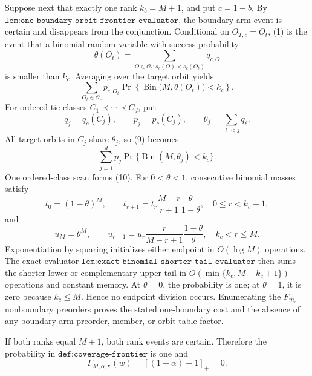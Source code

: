 Suppose next that exactly one rank \(k_b=M+1\), and put \(c=1-b\). By \(\texttt{lem:one-boundary-orbit-frontier-evaluator}\), the boundary-arm event is certain and disappears from the conjunction. Conditional on \(O_{T,c}=O_t\), (1) is the event that a binomial random variable with success probability
\[
\theta(O_t)=\sum_{O\in\mathcal O_c:s_c(O)<s_c(O_t)}q_{c,O}\tag{8}
\]
is smaller than \(k_c\). Averaging over the target orbit yields
\[
\sum_{O_t\in\mathcal O_c}p_{c,O_t}\Pr\!\left\{\operatorname{Bin}\bigl(M,\theta(O_t)\bigr)<k_c\right\}.\tag{9}
\]
For ordered tie classes \(C_1\prec\cdots\prec C_d\), put
\[
q_j=q_c(C_j),\qquad p_j=p_c(C_j),\qquad \theta_j=\sum_{\ell<j}q_\ell.\tag{10}
\]
All target orbits in \(C_j\) share \(\theta_j\), so (9) becomes
\[
\sum_{j=1}^d p_j\Pr\{\operatorname{Bin}(M,\theta_j)<k_c\}.\tag{11}
\]
One ordered-class scan forms (10). For \(0<\theta<1\), consecutive binomial masses satisfy
\[
t_0=(1-\theta)^M,\qquad t_{r+1}=t_r\frac{M-r}{r+1}\frac{\theta}{1-\theta},\quad 0\le r<k_c-1,\tag{12}
\]
and
\[
u_M=\theta^M,\qquad u_{r-1}=u_r\frac{r}{M-r+1}\frac{1-\theta}{\theta},\quad k_c<r\le M.\tag{13}
\]
Exponentiation by squaring initializes either endpoint in \(O(\log M)\) operations. The exact evaluator \(\texttt{lem:exact-binomial-shorter-tail-evaluator}\) then sums the shorter lower or complementary upper tail in \(O(\min\{k_c,M-k_c+1\})\) operations and constant memory. At \(\theta=0\), the probability is one; at \(\theta=1\), it is zero because \(k_c\le M\). Hence no endpoint division occurs. Enumerating the \(F_{m_c}\) nonboundary preorders proves the stated one-boundary cost and the absence of any boundary-arm preorder, member, or orbit-table factor.

If both ranks equal \(M+1\), both rank events are certain. Therefore the probability in \(\texttt{def:coverage-frontier}\) is one and
\[
\Gamma_{M,\alpha,\boldsymbol\varepsilon}(w)=[(1-\alpha)-1]_+=0.\tag{14}
\]

